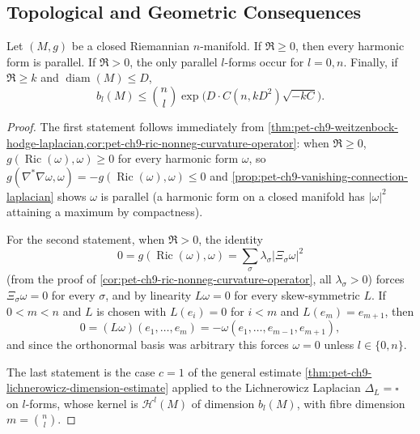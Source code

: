 \subsection{Topological and Geometric Consequences}

\begin{theorem}
  \label{thm:pet-ch9-nonneg-curvature-operator-parallel-forms}
  Let $(M,g)$ be a closed Riemannian $n$-manifold. If $\mathfrak{R}\ge0$, then
  every harmonic form is parallel. If $\mathfrak{R}>0$, the only parallel
  $l$-forms occur for $l=0,n$. Finally, if $\mathfrak{R}\ge k$ and
  $\operatorname{diam}(M)\le D$,
  \[
    b_l(M)\le\binom{n}{l}\exp\big(D\cdot C(n,kD^2)\sqrt{-kC}\big).
  \]
\end{theorem}
\begin{proof}
  The first statement follows immediately from
  \cref{thm:pet-ch9-weitzenbock-hodge-laplacian,cor:pet-ch9-ric-nonneg-curvature-operator}:
  when $\mathfrak{R}\ge0$, $g(\operatorname{Ric}(\omega),\omega)\ge0$ for every harmonic
  form $\omega$, so $g(\nabla^*\nabla\omega,\omega)=-g(\operatorname{Ric}(\omega),\omega)\le0$
  and \cref{prop:pet-ch9-vanishing-connection-laplacian} shows $\omega$ is
  parallel (a harmonic form on a closed manifold has $|\omega|^2$ attaining a
  maximum by compactness).

  For the second statement, when $\mathfrak{R}>0$, the identity
  \[
    0=g(\operatorname{Ric}(\omega),\omega)=\sum_\sigma\lambda_\sigma|\Xi_\sigma\omega|^2
  \]
  (from the proof of \cref{cor:pet-ch9-ric-nonneg-curvature-operator}, all
  $\lambda_\sigma>0$) forces $\Xi_\sigma\omega=0$ for every $\sigma$, and by
  linearity $L\omega=0$ for every skew-symmetric $L$. If $0<m<n$ and $L$ is
  chosen with $L(e_i)=0$ for $i<m$ and $L(e_m)=e_{m+1}$, then
  \[
    0=(L\omega)(e_1,\dots,e_m)=-\omega(e_1,\dots,e_{m-1},e_{m+1}),
  \]
  and since the orthonormal basis was arbitrary this forces $\omega=0$ unless
  $l\in\{0,n\}$.

  The last statement is the case $c=1$ of the general estimate
  \cref{thm:pet-ch9-lichnerowicz-dimension-estimate} applied to the
  Lichnerowicz Laplacian $\Delta_L=\square$ on $l$-forms, whose kernel is
  $\mathcal{H}^l(M)$ of dimension $b_l(M)$, with fibre dimension
  $m=\binom{n}{l}$.
\end{proof}

